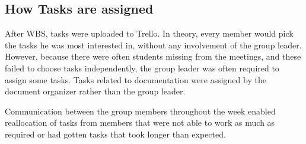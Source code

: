 \subsection {How Tasks are assigned}
After WBS, tasks were uploaded to Trello. In theory, every member would pick the tasks he was most interested in, without any involvement of the group leader. However, because there were often students missing from the meetings, and these failed to choose tasks independently, the group leader was often required to assign some tasks. Tasks related to documentation were assigned by the document organizer rather than the group leader.

Communication between the group members throughout the week enabled reallocation of tasks from members that were not able to work as much as required or had gotten tasks that took longer than expected.  